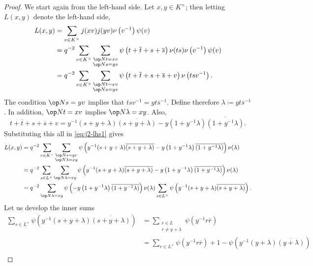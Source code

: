 \documentclass[../main.tex]{subfiles}
\begin{document}
\begin{proof}
	We start again from the left-hand side. Let $x,y\in K^\times$; then letting $L(x,y)$ denote the left-hand side,
	\begin{align}
		L(x,y) &= \sum_{v\in K^\times}j(xv)j(yv)\nu\left(v^{-1}\right)\psi(v) \notag \\
		 &= q^{-2}\sum_{v\in K^\times}\sum_{\substack{\op Nt=xv\\\op Ns=yv}}\psi\left(t+\overline t+s+\overline s\right)\nu(ts)\nu\left(v^{-1}\right)\psi(v) \notag \\
		&= q^{-2}\sum_{v\in K^\times}\sum_{\substack{\op Nt=xv\\\op Ns=yv}}\psi\left(t+\overline t+s+\overline s+v\right)\nu\left(tsv^{-1}\right). \label{eq:j2-lhs1}
	\end{align}
	The condition $\op Ns=yv$ implies that $tsv^{-1}=yt\overline s^{-1}$. Define therefore $\lambda\coloneqq yt\overline s^{-1}$. In addition, $\op Nt=xv$ implies $\op N\lambda=xy$. Also,
	\[t+\overline t+s+\overline s+v=y^{-1}(s+y+\lambda)\overline{(s+y+\lambda)}-y\left(1+y^{-1}\lambda\right)\overline{\left(1+y^{-1}\lambda\right)}.\]
	Substituting this all in \eqref{eq:j2-lhs1} gives
	\begin{align}
		L(x,y) &= q^{-2}\sum_{v\in K^\times}\sum_{\substack{\op Ns=yv\\\op N\lambda=xy}}\psi\left(y^{-1}(s+y+\lambda)\overline{(s+y+\lambda)}-y\left(1+y^{-1}\lambda\right)\overline{\left(1+y^{-1}\lambda\right)}\right)\nu(\lambda) \notag \\
		&= q^{-2}\sum_{s\in L^\times}\sum_{\op N\lambda=xy}\psi\left(y^{-1}(s+y+\lambda)\overline{(s+y+\lambda)}-y\left(1+y^{-1}\lambda\right)\overline{\left(1+y^{-1}\lambda\right)}\right)\nu(\lambda) \notag \\
		&= q^{-2}\sum_{\op N\lambda=xy}\psi\left(-y\left(1+y^{-1}\lambda\right)\overline{\left(1+y^{-1}\lambda\right)}\right)\nu(\lambda)\sum_{s\in L^\times}\psi\left(y^{-1}(s+y+\lambda)\overline{(s+y+\lambda)}\right). \label{eq:j2-lhs2}
	\end{align}
	Let us develop the inner sums
	\begin{align*}
		\sum_{s\in L^\times}\psi\left(y^{-1}(s+y+\lambda)\overline{(s+y+\lambda)}\right) &= \sum_{\substack{r\in L\\r\ne y+\lambda}}\psi\left(y^{-1}r\overline r\right) \\
		&= \sum_{r\in L^\times}\psi\left(y^{-1}r\overline r\right)+1-\psi\left(y^{-1}(y+\lambda)\overline{(y+\lambda)}\right) \\

\end{align*}
\end{proof}
\end{document}
